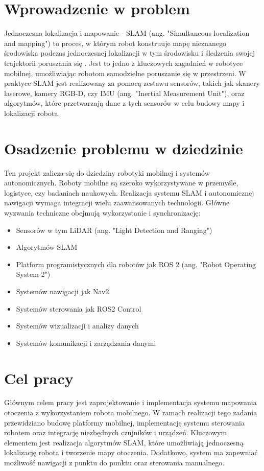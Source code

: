\documentclass[a4paper,twoside,12pt]{book}
\begin{document}
\section{Wprowadzenie w problem} 
Jednoczesna lokalizacja i mapowanie - SLAM (ang. "Simultaneous localization and mapping") to proces, w którym robot konstruuje mapę nieznanego środowiska podczas jednoczesnej lokalizacji w tym środowisku i śledzenia swojej trajektorii poruszania się \cite{bib:mediumslam}. Jest to jedno z kluczowych zagadnień w robotyce mobilnej, umożliwiając robotom samodzielne poruszanie się w przestrzeni. W praktyce SLAM jest realizowany za pomocą zestawu sensorów, takich jak skanery laserowe, kamery RGB-D, czy IMU (ang. "Inertial Measurement Unit"), oraz algorytmów, które przetwarzają dane z tych sensorów w celu budowy mapy i lokalizacji robota.
\newpage
\section{Osadzenie problemu w dziedzinie}
Ten projekt zalicza się do dziedziny robotyki mobilnej i systemów autonomicznych. Roboty mobilne są szeroko wykorzystywane w przemyśle, logistyce, czy badaniach naukowych.
Realizacja systemu SLAM i autonomicznej nawigacji wymaga integracji wielu zaawansowanych technologii. Główne wyzwania techniczne obejmują wykorzystanie i synchronizację:
\begin{itemize}
\item Sensorów w tym LiDAR (ang. "Light Detection and Ranging")
\item Algorytmów SLAM 
\item Platform programistycznych dla robotów jak ROS 2 (ang. "Robot Operating System 2")
\item Systemów nawigacji jak Nav2
\item Systemów sterowania jak ROS2 Control
\item Systemów wizualizacji i analizy danych
\item Systemów komunikacji i zarządzania danymi
\end{itemize}

\section{Cel pracy}
Głównym celem pracy jest zaprojektowanie i implementacja systemu mapowania otoczenia z wykorzystaniem robota mobilnego. W ramach realizacji tego zadania przewidziano budowę platformy mobilnej, implementację systemu sterowania robotem oraz integrację niezbędnych czujników i urządzeń. Kluczowym elementem jest realizacja algorytmów SLAM, które umożliwiają jednoczesną lokalizację robota i tworzenie mapy otoczenia. Dodatkowo, system ma zapewniać możliwość nawigacji z punktu do punktu oraz sterowania manualnego.
\end{document}
